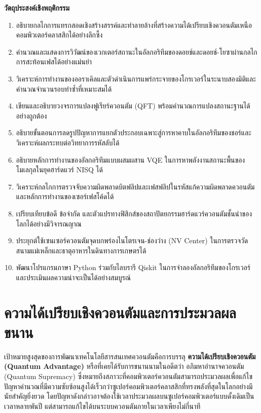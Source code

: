 \begin{lessonplanbox}
\noindent\textbf{วัตถุประสงค์เชิงพฤติกรรม}
\begin{enumerate}
    \item อธิบายกลไกการแทรกสอดเชิงสร้างสรรค์และทำลายล้างที่สร้างความได้เปรียบเชิงควอนตัมเหนือคอมพิวเตอร์คลาสสิกได้อย่างลึกซึ้ง
    \item คำนวณและแสดงการวิวัฒน์ของเวกเตอร์สถานะในอัลกอริทึมของดอยช์และดอยช์-โยซาผ่านกลไกการสะท้อนเฟสได้อย่างแม่นยำ
    \item วิเคราะห์การทำงานของออราเคิลและตัวดำเนินการแพร่กระจายของโกรเวอร์ในระนาบสองมิติและคำนวณจำนวนรอบทำซ้ำที่เหมาะสมได้
    \item เขียนและอธิบายวงจรการแปลงฟูเรียร์ควอนตัม (QFT) พร้อมคำนวณการแปลงสถานะฐานได้อย่างถูกต้อง
    \item อธิบายขั้นตอนการลดรูปปัญหาการแยกตัวประกอบเฉพาะสู่การหาคาบในอัลกอริทึมของชอร์และวิเคราะห์ผลกระทบต่อวิทยาการรหัสลับได้
    \item อธิบายหลักการทำงานของอัลกอริทึมแบบผสมผสาน VQE ในการหาพลังงานสถานะพื้นของโมเลกุลในยุคฮาร์ดแวร์ NISQ ได้
    \item วิเคราะห์กลไกการตรวจจับความผิดพลาดบิตฟลิปและเฟสฟลิปในรหัสแก้ความผิดพลาดควอนตัมและหลักการทำงานของเซอร์เฟสโค้ดได้
    \item เปรียบเทียบข้อดี ข้อจำกัด และตัวแปรทางฟิสิกส์ของสถาปัตยกรรมฮาร์ดแวร์ควอนตัมชั้นนำของโลกได้อย่างมีวิจารณญาณ
    \item ประยุกต์ใช้เซนเซอร์ควอนตัมจุดบกพร่องไนโตรเจน-ช่องว่าง (NV Center) ในการตรวจวัดสนามแม่เหล็กและธาตุอาหารในดินทางการเกษตรได้
    \item พัฒนาโปรแกรมภาษา Python ร่วมกับไลบรารี Qiskit ในการจำลองอัลกอริทึมของโกรเวอร์และประเมินผลความน่าจะเป็นได้อย่างสมบูรณ์
\end{enumerate}
\end{lessonplanbox}

\newpage
\section{ความได้เปรียบเชิงควอนตัมและการประมวลผลขนาน}

เป้าหมายสูงสุดของการพัฒนาเทคโนโลยีสารสนเทศควอนตัมคือการบรรลุ \textbf{ความได้เปรียบเชิงควอนตัม (Quantum Advantage)} หรือที่เคยได้รับการขนานนามในอดีตว่า อภิมหาอำนาจควอนตัม (Quantum Supremacy) ซึ่งหมายถึงสภาวะที่คอมพิวเตอร์ควอนตัมสามารถประมวลผลเพื่อแก้ไขปัญหาคำนวณที่มีความซับซ้อนสูงได้เร็วกว่าซูเปอร์คอมพิวเตอร์คลาสสิกที่ทรงพลังที่สุดในโลกอย่างมีนัยสำคัญยิ่งยวด โดยปัญหาดังกล่าวอาจต้องใช้เวลาประมวลผลบนซูเปอร์คอมพิวเตอร์แบบดั้งเดิมเป็นเวลาหลายพันปี แต่สามารถแก้ไขได้บนระบบควอนตัมภายในเวลาเพียงไม่กี่นาที

